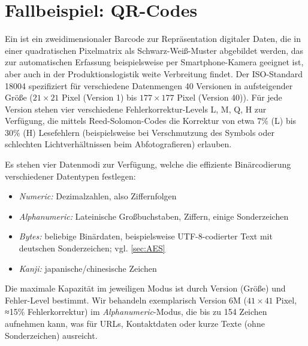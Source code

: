 \section{Fallbeispiel: QR-Codes}
Ein  ist ein zweidimensionaler Barcode zur Repräsentation digitaler Daten, die in einer quadratischen Pixelmatrix als Schwarz-Weiß-Muster abgebildet werden, das zur automatischen Erfassung beispielsweise per Smartphone-Kamera geeignet ist, aber auch in der Produktionslogistik weite Verbreitung findet. Der ISO-Standard 18004 \cite{QR2005Standard} spezifiziert für verschiedene Datenmengen 40 Versionen in aufsteigender Größe ($21×21$ Pixel (Version 1) bis $177×177$ Pixel (Version 40)). Für jede Version stehen vier verschiedene Fehlerkorrektur-Levels L, M, Q, H zur Verfügung, die mittels Reed-Solomon-Codes die Korrektur von etwa 7\% (L) bis 30\% (H) Lesefehlern (beispielsweise bei Verschmutzung des Symbols oder schlechten Lichtverhältnissen beim Abfotografieren) erlauben.
\begin{Center}
\end{Center}
Es stehen vier Datenmodi zur Verfügung, welche die effiziente Binärcodierung verschiedener Datentypen festlegen:
\begin{itemize}
  \item \emph{Numeric:} Dezimalzahlen, also Ziffernfolgen
  \item \emph{Alphanumeric:} Lateinische Großbuchstaben, Ziffern, einige Sonderzeichen
  \item \emph{Bytes:} beliebige Binärdaten, beispielsweise UTF-8-codierter Text mit deutschen Sonderzeichen; vgl. \cref{sec:AES}
  \item \emph{Kanji:} japanische/chinesische Zeichen
\end{itemize}
Die maximale Kapazität im jeweiligen Modus ist durch Version (Größe) und Fehler-Level bestimmt. Wir behandeln exemplarisch Version 6M ($41×41$ Pixel, ≈15\% Fehlerkorrektur) im \emph{Alphanumeric}-Modus, die bis zu 154 Zeichen aufnehmen kann, was für URLs, Kontaktdaten oder kurze Texte (ohne Sonderzeichen) ausreicht.
